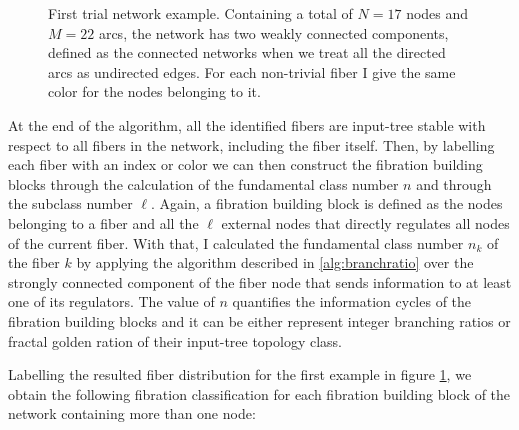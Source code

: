 \documentclass[12pt]{diazessay} %
\begin{document}
\begin{figure}[h]
	\caption{First trial network example. Containing a total of $N = 17$ nodes and $M = 22$ arcs, the network has two weakly connected components, defined as the connected networks when we treat all the directed arcs as undirected edges. For each non-trivial fiber I give the same color for the nodes belonging to it.}
	\label{fig:result1}
\end{figure}

At the end of the algorithm, all the identified fibers are input-tree stable with respect to all fibers in the network, including the fiber itself. Then, by labelling each fiber with an index or color we can then construct the fibration building blocks through the calculation of the fundamental class number $n$ and through the subclass number $\ell$. Again, a fibration building block is defined as the nodes belonging to a fiber and all the $\ell$ external nodes that directly regulates all nodes of the current fiber. With that, I calculated the fundamental class number $n_k$ of the fiber $k$ by applying the algorithm described in \ref{alg:branchratio} over the strongly connected component of the fiber node that sends information to at least one of its regulators. The value of $n$ quantifies the information cycles of the fibration building blocks and it can be either represent integer branching ratios or fractal golden ration of their input-tree topology class.

Labelling the resulted fiber distribution for the first example in figure \ref{fig:result1}, we obtain the following fibration classification for each fibration building block of the network containing more than one node:
\end{document}
